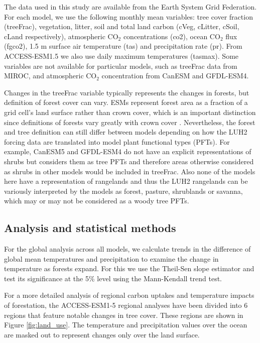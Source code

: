 \documentclass[]{article}
\begin{document}
The data used in this study are available from the Earth System Grid Federation.
For each model, we use the following monthly mean variables: tree cover fraction (treeFrac), vegetation, litter, soil and total land carbon (cVeg, cLitter, cSoil, cLand respectively), atmospheric CO$_2$ concentrations (co2), ocean CO$_2$ flux (fgco2), 1.5 m surface air temperature (tas) and precipitation rate (pr).
From ACCESS-ESM1.5 we also use daily maximum temperatures (tasmax).
Some variables are not available for particular models, such as treeFrac data from MIROC, and atmospheric CO$_2$ concentration from CanESM and GFDL-ESM4.

Changes in the treeFrac variable typically represents the changes in forests, but definition of forest cover can vary.
ESMs represent forest area as a fraction of a grid cell's land surface rather than crown cover, which is an important distinction since definitions of forests vary greatly with crown cover \parencite{zomer_land_2008}.
Nevertheless, the forest and tree definition can still differ between models depending on how the LUH2 forcing data are translated into model plant functional types (PFTs).
For example, CanESM5 and GFDL-ESM4 do not have an explicit representations of shrubs but considers them as tree PFTs and therefore areas otherwise considered as shrubs in other models would be included in treeFrac.
Also none of the models here have a representation of rangelands and thus the LUH2 rangelands can be variously interpreted by the models as forest, pasture, shrublands or savanna, which may or may not be considered as a woody tree PFTs.

\subsection{Analysis and statistical methods}

For the global analysis across all models, we calculate trends in the difference of global mean temperatures and precipitation to examine the change in temperature as forests expand.
For this we use the Theil-Sen slope estimator and test its significance at the 5\% level using the Mann-Kendall trend test.

For a more detailed analysis of regional carbon uptakes and temperature impacts of forestation, the ACCESS-ESM1-5 regional analyses have been divided into 6 regions that feature notable changes in tree cover.
These regions are shown in Figure \ref{fig:land_use}.
The temperature and precipitation values over the ocean are masked out to represent changes only over the land surface.
\end{document}
